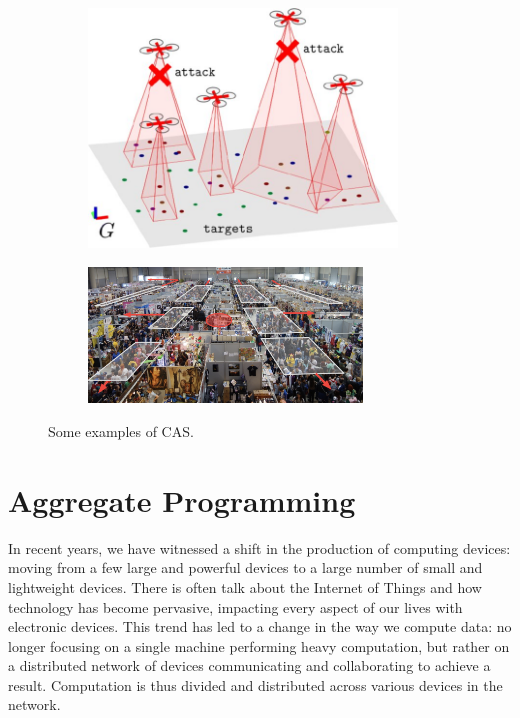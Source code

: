 \documentclass[12pt,a4paper,openright,twoside]{book}
\begin{document}
\begin{figure}[h]
  \centering
  \begin{subfigure}[b]{0.49\textwidth}
    \centering
    \includegraphics[width=0.9\textwidth]{figures/swarm2.jpeg}
  \end{subfigure}

  \begin{subfigure}[b]{0.49\textwidth}
    \centering
    \includegraphics[width=0.8\textwidth]{figures/crowd.png}
  \end{subfigure}
  \caption{Some examples of CAS.}
\end{figure}

\section{Aggregate Programming}

In recent years, we have witnessed a shift in the production of computing devices: moving from a few large and powerful devices to a large number of small and lightweight devices.
There is often talk about the Internet of Things and how technology has become pervasive, impacting every aspect of our lives with electronic devices.
This trend has led to a change in the way we compute data: no longer focusing on a single machine performing heavy computation, but rather on a distributed network of devices communicating and collaborating to achieve a result.
Computation is thus divided and distributed across various devices in the network.
\end{document}
